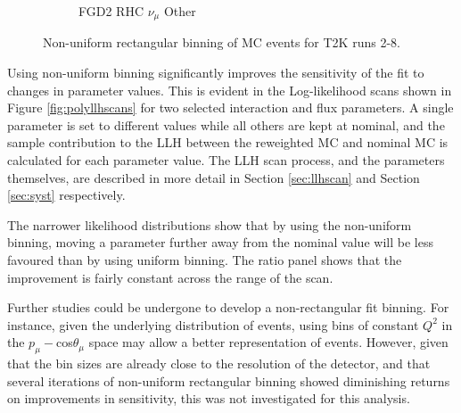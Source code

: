 \begin{figure}
\begin{subfigure}{.32\textwidth}
  \caption{FGD2 RHC $\nu_{\mu}$ Other}
  \label{fig:th2polyFGD2_NuMuBkg_CCOther_in_AntiNu_Mode}
\end{subfigure}
\caption{Non-uniform rectangular binning of MC events for T2K runs 2-8.}
\label{fig:th2polybin}
\end{figure}

Using non-uniform binning significantly improves the sensitivity of the fit to changes in parameter values. This is evident in the Log-likelihood scans shown in Figure \ref{fig:polyllhscans} for two selected interaction and flux parameters. A single parameter is set to different values while all others are kept at nominal, and the sample contribution to the LLH between the reweighted MC and nominal MC is calculated for each parameter value. The LLH scan process, and the parameters themselves, are described in more detail in Section \ref{sec:llhscan} and Section \ref{sec:syst} respectively.

The narrower likelihood distributions show that by using the non-uniform binning, moving a parameter further away from the nominal value will be less favoured than by using uniform binning. The ratio panel shows that the improvement is fairly constant across the range of the scan.

Further studies could be undergone to develop a non-rectangular fit binning. For instance, given the underlying distribution of events, using bins of constant $Q^2$ in the $p_{\mu}-$cos$\theta_{\mu}$ space may allow a better representation of events. However, given that the bin sizes are already close to the resolution of the detector, and that several iterations of non-uniform rectangular binning showed diminishing returns on improvements in sensitivity, this was not investigated for this analysis.

